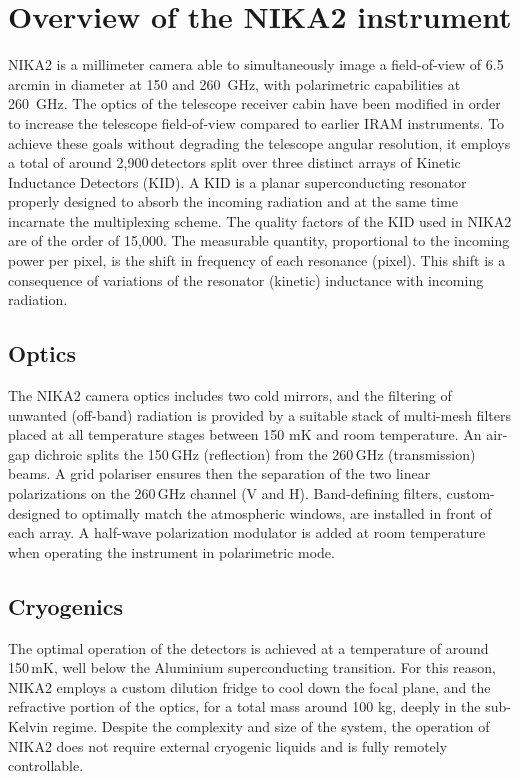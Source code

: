 
\section{Overview of the NIKA2 instrument}%

NIKA2 is a millimeter camera able to simultaneously image a field-of-view of
6.5\,arcmin in diameter at 150 and 260~GHz, with polarimetric capabilities at
260~GHz. The optics of the telescope receiver cabin have been modified in order
to increase the telescope field-of-view compared to earlier IRAM instruments. To
achieve these goals without degrading the telescope angular resolution, it
employs a total of around 2,900\,detectors split over three distinct arrays of
Kinetic Inductance Detectors (KID). A KID is a planar superconducting resonator
properly designed to absorb the incoming radiation and at the same time
incarnate the multiplexing scheme. The quality factors of the KID used in NIKA2
are of the order of 15,000. The measurable quantity, proportional to the
incoming power per pixel, is the shift in frequency of each resonance
(pixel). This shift is a consequence of variations of the resonator (kinetic)
inductance with incoming radiation.

\subsection{Optics}

The NIKA2 camera optics includes two cold mirrors, and the filtering of unwanted
(off-band) radiation is provided by a suitable stack of multi-mesh filters
placed at all temperature stages between 150 mK and room temperature. An air-gap
dichroic splits the 150\,GHz (reflection) from the 260\,GHz (transmission)
beams. A grid polariser ensures then the separation of the two linear
polarizations on the 260\,GHz channel (V and H). Band-defining filters,
custom-designed to optimally match the atmospheric windows, are installed in
front of each array. A half-wave polarization modulator is added at room
temperature when operating the instrument in polarimetric mode.




\subsection{Cryogenics}

The optimal operation of the detectors is achieved at a temperature of around
150\,mK, well below the Aluminium superconducting transition. For this reason,
NIKA2 employs a custom dilution fridge to cool down the focal plane, and the
refractive portion of the optics, for a total mass around 100 kg, deeply in the
sub-Kelvin regime. Despite the complexity and size of the system, the operation
of NIKA2 does not require external cryogenic liquids and is fully remotely
controllable.

